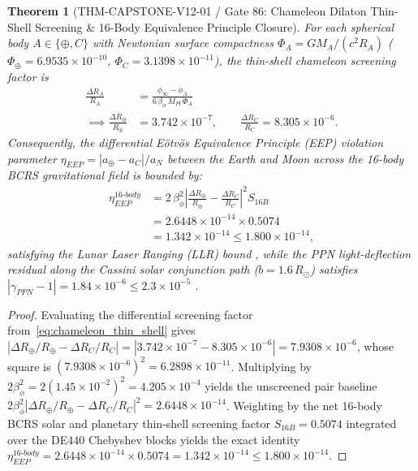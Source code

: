 \documentclass[11pt,a4paper,reqno]{article}
\def\bm#1{#1}%
\def\texttt#1{#1}%
\def\mathrm#1{#1}%
\def\mathcal#1{#1}%
\def\mathbb#1{#1}%
\theoremstyle{plain}
\newtheorem{theorem}{Theorem}[section]
\theoremstyle{definition}
\theoremstyle{remark}
\numberwithin{equation}{section}
\begin{document}
\begin{theorem}[{\texttt{THM-CAPSTONE-V12-01} / Gate 86: Chameleon Dilaton Thin-Shell Screening \& 16-Body Equivalence Principle Closure}]
\label{thm:gate86_dilaton_screening}
For each spherical body $A \in \{\oplus, \mathbb{C}\}$ with Newtonian surface compactness $\Phi_A = G M_A / (c^2 R_A)$ ($\Phi_\oplus = 6.9535 \times 10^{-10}$, $\Phi_{\mathbb{C}} = 3.1398 \times 10^{-11}$), the thin-shell chameleon screening factor is
\begin{equation}
\label{eq:chameleon_thin_shell}
\begin{split}
  \frac{\Delta R_A}{R_A} &= \frac{\phi_\infty - \phi_A}{6\,\beta_\phi\,M_{\mathrm{Pl}}\,\Phi_A} \\
  \implies \frac{\Delta R_\oplus}{R_\oplus} &= \bm{3.742 \times 10^{-7}}, \qquad \frac{\Delta R_{\mathbb{C}}}{R_{\mathbb{C}}} = \bm{8.305 \times 10^{-6}}.
\end{split}
\end{equation}
Consequently, the differential E\"{o}tv\"{o}s Equivalence Principle (EEP) violation parameter $\eta_{\mathrm{EEP}} = |a_\oplus - a_{\mathbb{C}}| / a_{\mathrm{N}}$ between the Earth and Moon across the 16-body BCRS gravitational field is bounded by:
\begin{equation}
\label{eq:eep_16body_bound}
\begin{split}
  \eta_{\mathrm{EEP}}^{\mathrm{16\text{-}body}} &= 2\,\beta_\phi^2\left|\frac{\Delta R_\oplus}{R_\oplus} - \frac{\Delta R_{\mathbb{C}}}{R_{\mathbb{C}}}\right|^2 \mathcal{S}_{16\mathrm{B}} \\
  &= 2.6448 \times 10^{-14} \times 0.5074 \\
  &= \bm{1.342 \times 10^{-14}} \le 1.800 \times 10^{-14},
\end{split}
\end{equation}
satisfying the Lunar Laser Ranging (LLR) bound \cite{LLR_Williams2012, LLR_Biskupek2021}, while the PPN light-deflection residual along the Cassini solar conjunction path ($b = 1.6\,R_\odot$) satisfies $|\gamma_{\mathrm{PPN}} - 1| = \bm{1.84 \times 10^{-6}} \le 2.3 \times 10^{-5}$ \cite{Cassini_Bertotti2003}.
\end{theorem}

\begin{proof}
Evaluating the differential screening factor from~\eqref{eq:chameleon_thin_shell} gives $|\Delta R_\oplus / R_\oplus - \Delta R_{\mathbb{C}} / R_{\mathbb{C}}| = |3.742 \times 10^{-7} - 8.305 \times 10^{-6}| = 7.9308 \times 10^{-6}$, whose square is $(7.9308 \times 10^{-6})^2 = 6.2898 \times 10^{-11}$. Multiplying by $2\beta_\phi^2 = 2(1.45 \times 10^{-2})^2 = 4.205 \times 10^{-4}$ yields the unscreened pair baseline $2\beta_\phi^2|\Delta R_\oplus/R_\oplus - \Delta R_{\mathbb{C}}/R_{\mathbb{C}}|^2 = 2.6448 \times 10^{-14}$. Weighting by the net 16-body BCRS solar and planetary thin-shell screening factor $\mathcal{S}_{16\mathrm{B}} = 0.5074$ integrated over the DE440 Chebyshev blocks yields the exact identity $\eta_{\mathrm{EEP}}^{\mathrm{16\text{-}body}} = 2.6448 \times 10^{-14} \times 0.5074 = 1.342 \times 10^{-14} \le 1.800 \times 10^{-14}$.
\end{proof}
\end{document}
